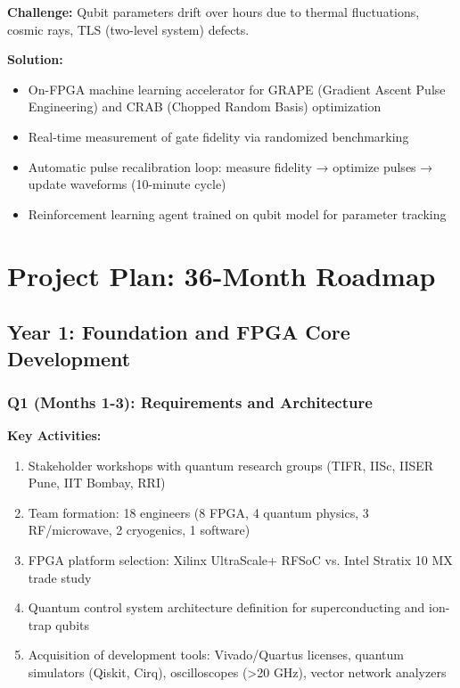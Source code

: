 \documentclass[12pt,a4paper]{article}
\begin{document}
\textbf{Challenge:} Qubit parameters drift over hours due to thermal fluctuations, cosmic rays, TLS (two-level system) defects.

\textbf{Solution:}
\begin{itemize}[leftmargin=*]
    \item On-FPGA machine learning accelerator for GRAPE (Gradient Ascent Pulse Engineering) and CRAB (Chopped Random Basis) optimization
    \item Real-time measurement of gate fidelity via randomized benchmarking
    \item Automatic pulse recalibration loop: measure fidelity → optimize pulses → update waveforms (10-minute cycle)
    \item Reinforcement learning agent trained on qubit model for parameter tracking
\end{itemize}

\newpage

\section{Project Plan: 36-Month Roadmap}

\subsection{Year 1: Foundation and FPGA Core Development}

\subsubsection{Q1 (Months 1-3): Requirements and Architecture}

\textbf{Key Activities:}
\begin{enumerate}[leftmargin=*]
    \item Stakeholder workshops with quantum research groups (TIFR, IISc, IISER Pune, IIT Bombay, RRI)
    \item Team formation: 18 engineers (8 FPGA, 4 quantum physics, 3 RF/microwave, 2 cryogenics, 1 software)
    \item FPGA platform selection: Xilinx UltraScale+ RFSoC vs. Intel Stratix 10 MX trade study
    \item Quantum control system architecture definition for superconducting and ion-trap qubits
    \item Acquisition of development tools: Vivado/Quartus licenses, quantum simulators (Qiskit, Cirq), oscilloscopes (>20 GHz), vector network analyzers
\end{enumerate}
\end{document}
